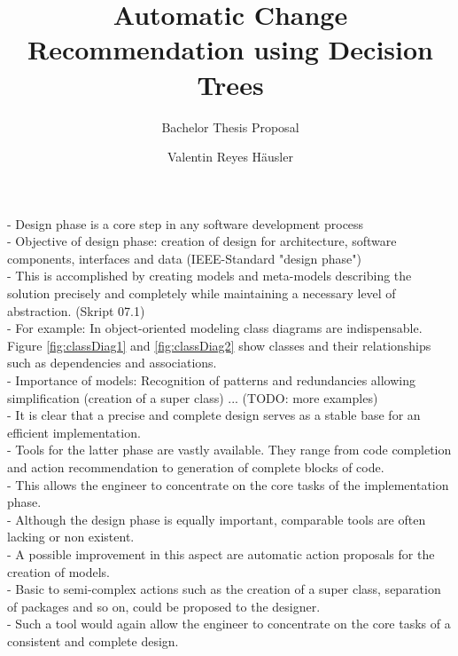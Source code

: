 \documentclass[10pt,a4paper,oneside]{scrartcl}
\title{Automatic Change Recommendation using Decision Trees}
\subtitle{Bachelor Thesis Proposal}
\author{Valentin Reyes Häusler}
\begin{document}
	
	\maketitle
	
	\section{}
	\label{sec:motivation}
	
	- Design phase is a core step in any software development process
	\\
	- Objective of design phase: creation of design for architecture, software components, interfaces and data (IEEE-Standard "design phase")
	\\
	- This is accomplished by creating models and meta-models describing the solution precisely and completely while maintaining a necessary level of abstraction. (Skript 07.1)
	\\
	- For example: In object-oriented modeling class diagrams are indispensable. Figure \ref{fig:classDiag1} and \ref{fig:classDiag2} show classes and their relationships such as dependencies and associations. 
	\\
	- Importance of models: 
	Recognition of patterns and redundancies allowing simplification (creation of a super class) 
	... (TODO: more examples)
	\\
	- It is clear that a precise and complete design serves as a stable base for an efficient implementation.
	\\
	- Tools for the latter phase are vastly available. They range from code completion and action recommendation to generation of complete blocks of code.
	\\
	- This allows the engineer to concentrate on the core tasks of the implementation phase.
	\\
	- Although the design phase is equally important, comparable tools are often lacking or non existent.
	\\
	- A possible improvement in this aspect are automatic action proposals for the creation of models.
	\\
	- Basic to semi-complex actions such as the creation of a super class, separation of packages and so on, could be proposed to the designer.
	\\
	- Such a tool would again allow the engineer to concentrate on the core tasks of a consistent and complete design.
	\\
\end{document}
